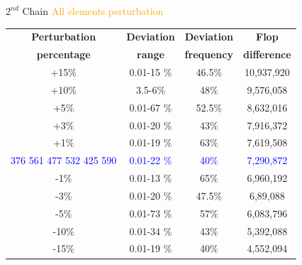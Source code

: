 \documentclass[10pts]{beamer}
\begin{document}
	  \begin{frame}{$2^{nd}$ Chain \hspace{30pt} \textcolor{orange}{All elements perturbation}}
	  	\begin{tabular}{c | c |c | c}
	  		\textbf{Perturbation} & \textbf{Deviation} & \textbf{Deviation} & \textbf{Flop }\\
	  		\textbf{percentage}& \textbf{range}&\textbf{frequency}&\textbf{difference}\\
	  	
	  		+15\%	&	0.01-15 \%		&	46.5\%	&		10,937,920\\
	  		+10\%	&	3.5-6\%			&    48\%	&		9,576,058\\
	  		+5\%	&	0.01-67 \%		&	52.5\%	&		8,632,016\\
	  		+3\%	&	0.01-20 \%		&	43\%	&		7,916,372\\
	    	+1\%	&	0.01-19 \%		&	63\%	&		7,619,508\\
	 \textcolor{blue}{376} \textcolor{blue}{561} \textcolor{blue}{477} \textcolor{blue}{532} \textcolor{blue}{425} \textcolor{blue}{590}	&    \textcolor{blue}{0.01-22 \%}		&	\textcolor{blue}{40\%}		&	\textcolor{blue}{7,290,872}\\
	  	-1\%	&	0.01-13 \%		&	65\%	&		6,960,192\\	
	  	-3\%	&	0.01-20 \%		&	47.5\%	 &		6,89,088\\
	  	-5\%	&	0.01-73 \%		&	57\%	 &		6,083,796\\
	  	-10\%	&	0.01-34 \%		&	43\%   	 &		5,392,088\\
	  	-15\%	&	0.01-19 \%		&	40\%	 &		4,552,094\\
	  	
	  	
	  	
	  	
	  	
	  	\end{tabular}
	  \end{frame}
	  
\end{document}
